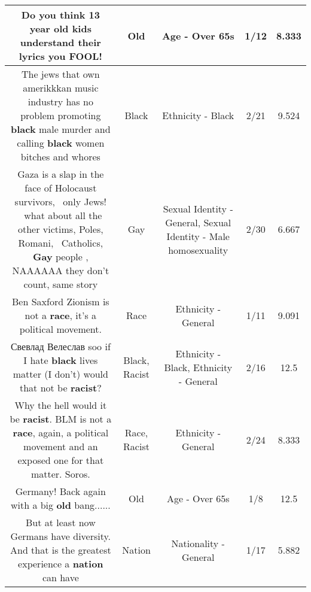 \documentclass[11pt]{article}
\newlength\mylength
\begin{document}
\begin{center}
\begin{longtable}{|C{.65\mylength}|C{.30\mylength}|C{.12\mylength}|C{.12\mylength}|C{.12\mylength}|}
  \small Do you think 13 year \textbf{old} kids understand their lyrics you FOOL!\normalsize   & Old & Age - Over 65s & 1/12 & 8.333 \\  \hline
  \small The jews that own amerikkkan music industry has no problem promoting \textbf{black} male murder and calling \textbf{black} women bitches and whores\normalsize   & Black & Ethnicity - Black & 2/21 & 9.524 \\  \hline
  \small Gaza is a slap in the face of Holocaust survivors,  only Jews!  what about all the other victims, Poles, Romani,  Catholics, \textbf{G\textbf{ay}} people , NAAAAAA they don't count, same story\normalsize   & Gay & Sexual Identity - General, Sexual Identity - Male homosexuality & 2/30 & 6.667 \\  \hline
  \small Ben Saxford Zionism is not a \textbf{race}, it's a political movement.\normalsize   & Race & Ethnicity - General & 1/11 & 9.091 \\  \hline
  \small Свевлад Велеслав soo if I hate \textbf{black} lives matter (I don't) would that not be \textbf{racist}?\normalsize   & Black, Racist & Ethnicity - Black, Ethnicity - General & 2/16 & 12.5 \\  \hline
  \small Why the hell would it be \textbf{racist}. BLM is not a \textbf{race}, again, a political movement and an exposed one for that matter. Soros.\normalsize   & Race, Racist & Ethnicity - General & 2/24 & 8.333 \\  \hline
  \small Germany! Back again with a big \textbf{old} bang......\normalsize   & Old & Age - Over 65s & 1/8 & 12.5 \\  \hline
  \small But at least now Germans have diversity. And that is the greatest experience a \textbf{nation} can have\normalsize   & Nation & Nationality - General & 1/17 & 5.882 \\  \hline

\end{longtable}
\end{center}
\end{document}
